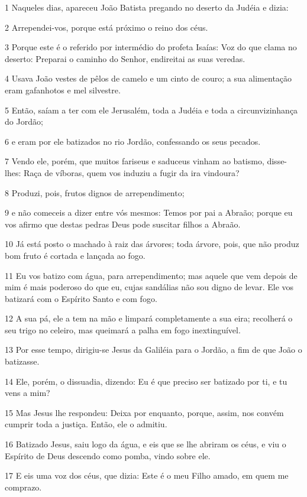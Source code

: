 \par 1 Naqueles dias, apareceu João Batista pregando no deserto da Judéia e dizia:
\par 2 Arrependei-vos, porque está próximo o reino dos céus.
\par 3 Porque este é o referido por intermédio do profeta Isaías: Voz do que clama no deserto: Preparai o caminho do Senhor, endireitai as suas veredas.
\par 4 Usava João vestes de pêlos de camelo e um cinto de couro; a sua alimentação eram gafanhotos e mel silvestre.
\par 5 Então, saíam a ter com ele Jerusalém, toda a Judéia e toda a circunvizinhança do Jordão;
\par 6 e eram por ele batizados no rio Jordão, confessando os seus pecados.
\par 7 Vendo ele, porém, que muitos fariseus e saduceus vinham ao batismo, disse-lhes: Raça de víboras, quem vos induziu a fugir da ira vindoura?
\par 8 Produzi, pois, frutos dignos de arrependimento;
\par 9 e não comeceis a dizer entre vós mesmos: Temos por pai a Abraão; porque eu vos afirmo que destas pedras Deus pode suscitar filhos a Abraão.
\par 10 Já está posto o machado à raiz das árvores; toda árvore, pois, que não produz bom fruto é cortada e lançada ao fogo.
\par 11 Eu vos batizo com água, para arrependimento; mas aquele que vem depois de mim é mais poderoso do que eu, cujas sandálias não sou digno de levar. Ele vos batizará com o Espírito Santo e com fogo.
\par 12 A sua pá, ele a tem na mão e limpará completamente a sua eira; recolherá o seu trigo no celeiro, mas queimará a palha em fogo inextinguível.
\par 13 Por esse tempo, dirigiu-se Jesus da Galiléia para o Jordão, a fim de que João o batizasse.
\par 14 Ele, porém, o dissuadia, dizendo: Eu é que preciso ser batizado por ti, e tu vens a mim?
\par 15 Mas Jesus lhe respondeu: Deixa por enquanto, porque, assim, nos convém cumprir toda a justiça. Então, ele o admitiu.
\par 16 Batizado Jesus, saiu logo da água, e eis que se lhe abriram os céus, e viu o Espírito de Deus descendo como pomba, vindo sobre ele.
\par 17 E eis uma voz dos céus, que dizia: Este é o meu Filho amado, em quem me comprazo.

